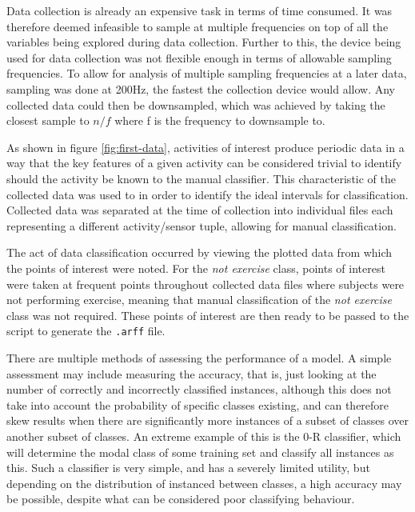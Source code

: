 Data collection is already an expensive task in terms of time consumed. It was therefore deemed infeasible to sample at multiple frequencies on top of all the variables being explored during data collection. Further to this, the device being used for data collection was not flexible enough in terms of allowable sampling frequencies. To allow for analysis of multiple sampling frequencies at a later data, sampling was done at 200Hz, the fastest the collection device would allow. Any collected data could then be downsampled, which was achieved by taking the closest sample to $n/f$ where f is the frequency to downsample to.

As shown in figure \ref{fig:first-data}, activities of interest produce periodic data in a way that the key features of a given activity can be considered trivial to identify should the activity be known to the manual classifier. This characteristic of the collected data was used to in order to identify the ideal intervals for classification. Collected data was separated at the time of collection into individual files each representing a different activity/sensor tuple, allowing for manual classification. 

The act of data classification occurred by viewing the plotted data from which the points of interest were noted. For the \textit{not exercise} class, points of interest were taken at frequent points throughout collected data files where subjects were not performing exercise, meaning that manual classification of the \textit{not exercise} class was not required. These points of interest are then ready to be passed to the script to generate the \texttt{.arff} file.

There are multiple methods of assessing the performance of a model. A simple assessment may include measuring the accuracy, that is, just looking at the number of correctly and incorrectly classified instances, although this does not take into account the probability of specific classes existing, and can therefore skew results when there are significantly more instances of a subset of classes over another subset of classes. An extreme example of this is the 0-R classifier, which will determine the modal class of some training set and classify all instances as this. Such a classifier is very simple, and has a severely limited utility, but depending on the distribution of instanced between classes, a high accuracy may be possible, despite what can be considered poor classifying behaviour.

